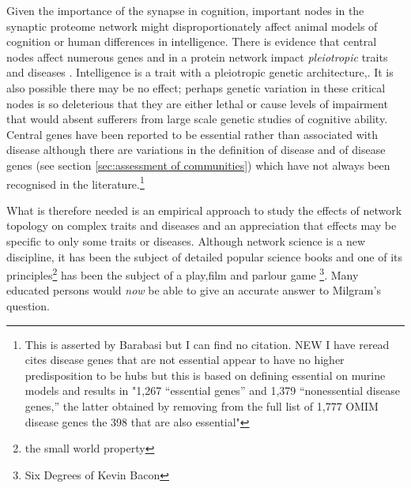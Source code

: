 Given the importance of the synapse in cognition, important nodes in the synaptic proteome network might disproportionately affect animal models of cognition or human differences in intelligence. There is evidence that central nodes affect numerous genes and in a protein network impact \textit{pleiotropic} traits and diseases \cite{chavali2010network}. Intelligence is a trait with a pleiotropic genetic architecture\cite{plomin2015genetics},\cite{visscher2016plethora}.  It is also possible there may be no effect; perhaps genetic variation in these critical nodes is so deleterious that they are either lethal or cause levels of impairment that would absent sufferers from large scale genetic studies of cognitive ability. Central genes have been reported to be essential rather than associated with disease\cite{barabasi2011network} although there are variations in the definition of disease and of disease genes (see section \ref{sec:assessment of communities}) which have not always been recognised in the literature.\footnote{This is asserted by Barabasi but I can find no citation. NEW I have reread cites \cite{goh2007human} disease genes that are not essential appear to have no higher predisposition to be hubs but this is based on defining essential on murine models and results in "1,267 “essential genes” and 1,379 “nonessential disease genes,” the latter obtained by removing from the full list of 1,777 OMIM disease genes the 398 that are also essential"}
 
 What is therefore needed is an empirical approach to study the effects of network topology on complex traits and diseases and an appreciation that effects may be specific to only some traits or diseases. Although network science is a new discipline, it has been the subject of detailed popular science books \cite{barabasi2002linked} and one of its principles\footnote{the small world property} has been the subject of a play\cite{guare1990six},film and parlour game \footnote{Six Degrees of Kevin Bacon}\cite{collins1998s}. Many educated persons would \textit{now} be able to give an accurate answer to Milgram's question. 

